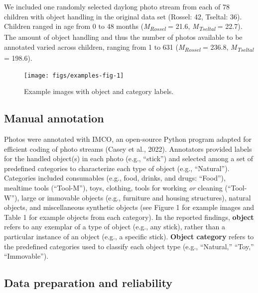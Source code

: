 \documentclass[10pt, letterpaper]{article}
\newenvironment{CodeChunk}{}{}
\begin{document}
We included one randomly selected daylong photo stream from each of 78
children with object handling in the original data set (Rossel: 42,
Tseltal: 36). Children ranged in age from 0 to 48 months
(\emph{M}\textsubscript{\emph{Rossel}} = 21.6,
\emph{M}\textsubscript{\emph{Tseltal}} = 22.7). The amount of object
handling and thus the number of photos available to be annotated varied
across children, ranging from 1 to 631
(\emph{M}\textsubscript{\emph{Rossel}} = 236.8,
\emph{M}\textsubscript{\emph{Tseltal}} = 198.6).

\begin{CodeChunk}
\begin{figure}[h]

{\centering \texttt{[image: figs/examples-fig-1]} 

}

\caption[Example images with object and category labels]{Example images with object and category labels.}\label{fig:examples-fig}
\end{figure}
\end{CodeChunk}

\hypertarget{manual-annotation}{%
\subsection{Manual annotation}\label{manual-annotation}}

Photos were annotated with IMCO, an open-source Python program adapted
for efficient coding of photo streams (Casey et al., 2022). Annotators
provided labels for the handled object(s) in each photo (e.g.,
``stick'') and selected among a set of predefined categories to
characterize each type of object (e.g., ``Natural''). Categories
included consumables (e.g., food, drinks, and drugs: ``Food''), mealtime
tools (``Tool-M''), toys, clothing, tools for working \emph{or} cleaning
(``Tool-W''), large or immovable objects (e.g., furniture and housing
structures), natural objects, and miscellaneous synthetic objects (see
Figure 1 for example images and Table 1 for example objects from each
category). In the reported findings, \textbf{object} refers to any
exemplar of a type of object (e.g., any stick), rather than a particular
instance of an object (e.g., a specific stick). \textbf{Object category}
refers to the predefined categories used to classify each object type
(e.g., ``Natural,'' ``Toy,'' ``Immovable'').

\hypertarget{data-preparation-and-reliability}{%
\subsection{Data preparation and
reliability}\label{data-preparation-and-reliability}}
\end{document}
